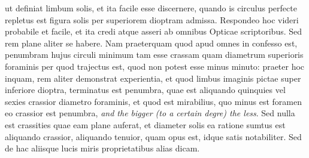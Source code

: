 \hspace{-1.8mm}ut definiat limbum solis, et ita facile esse discernere, quando is circulus perfecte repletus est figura solis per superiorem dioptram\protect{} admissa. Respondeo hoc videri probabile et facile, et ita credi atque asseri ab omnibus Opticae scriptoribus. Sed rem plane aliter se habere. Nam praeterquam quod apud omnes in confesso est, penumbram\protect{} hujus circuli minimum tam esse crassam quam diametrum superioris foraminis per quod trajectus est, quod non potest esse minus minuto: praeter hoc inquam, rem aliter demonstrat experientia, et quod limbus imaginis pictae super inferiore dioptra\protect{}, terminatus est penumbra\protect{}, quae est aliquando quinquies vel sexies crassior diametro foraminis, et quod est mirabilius, quo minus est foramen eo crassior est penumbra\protect{}, \textit{and the bigger (to a certain degre) the less}. Sed nulla est crassities quae eam plane auferat, et diameter solis\protect{} ea ratione sumtus est aliquando crassior, aliquando tenuior, quam opus est, idque satis notabiliter. Sed de hac aliisque lucis miris proprietatibus alias dicam. 
\pend 

